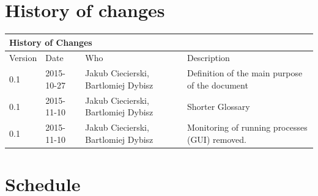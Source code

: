 \documentclass{article}
\begin{document}
\section*{History of changes}


\begin{center}

\begin{table}[h]
\hspace*{-1.1cm}
\large
\begin{tabular}{|l|l|l|l|}
\hline
\multicolumn{4}{|l|}{\cellcolor[HTML]{C0C0C0}History of Changes} \\ \hline
Version         & Date         & Who        & Description        

\\ \hline

0.1         
& 2015-10-27         
& Jakub Ciecierski, Bartlomiej Dybisz
& Definition of the main purpose of the document      

\\ \hline

0.1         
& 2015-11-10         
& Jakub Ciecierski, Bartlomiej Dybisz
& Shorter Glossary


\\ \hline

0.1         
& 2015-11-10         
& Jakub Ciecierski, Bartlomiej Dybisz
& Monitoring of running processes (GUI) removed.


\\ \hline
\end{tabular}
\end{table}


\end{center}

\section*{Schedule}
\end{document}
